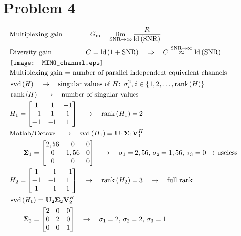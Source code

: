 \section*{Problem 4}
\begin{align*}
	&\text{Multiplexing gain}\qquad\qquad G_{\mathrm{m}}=\lim_{\mathrm{SNR}\rightarrow\infty}\frac{R}{\operatorname{ld}\left(\mathrm{SNR}\right)}& \\
	&\text{Diversity gain}\quad\qquad\qquad C=\operatorname{ld}\left(1+\mathrm{SNR}\right)\quad\Rightarrow\quad C\overset{\mathrm{SNR}\rightarrow\infty}{\approx}\operatorname{ld}\left(\mathrm{SNR}\right)& \\
	&\texttt{[image: MIMO\_channel.eps]}& \\
	&\text{Multiplexing gain $=$ number of parallel independent equivalent channels}& \\
	&\operatorname{svd}\left(H\right)\quad\rightarrow\quad\text{singular values of $H$: $\sigma_{i}^{2}$, $i\in\{1,2,\ldots,\operatorname{rank}\left(H\right)\}$}& \\
	&\operatorname{rank}\left(H\right)\quad\rightarrow\quad\text{number of singular values}& \\
	&H_{1}=
	\begin{bmatrix}
	1 & 1 & -1 \\
	-1 & 1 & 1 \\
	-1 & -1 & 1
	\end{bmatrix}\quad\rightarrow\quad\operatorname{rank}\left(H_{1}\right)=2& \\
	&\text{Matlab/Octave}\quad\rightarrow\quad\operatorname{svd}\left(H_{1}\right)=\mathbf{U}_{1}\mathbf{\Sigma}_{1}\mathbf{V}_{1}^{H}& \\
	&\qquad\mathbf{\Sigma}_{1}=
	\begin{bmatrix}
	2,56 & 0 & 0 \\
	0 & 1,56 & 0 \\
	0 & 0 & 0 
	\end{bmatrix}\quad\rightarrow\quad\text{$\sigma_{1}=2,56$, $\sigma_{2}=1,56$, $\sigma_{3}=0$ $\rightarrow$ useless}& \\
	&H_{2}=
	\begin{bmatrix}
	1 & -1 & -1 \\
	-1 & -1 & 1 \\
	1 & -1 & 1
	\end{bmatrix}\quad\rightarrow\quad\operatorname{rank}\left(H_{2}\right)=3\quad\rightarrow\quad\text{full rank}& \\
	&\operatorname{svd}\left(H_{1}\right)=\mathbf{U}_{2}\mathbf{\Sigma}_{2}\mathbf{V}_{2}^{H}& \\
	&\qquad\mathbf{\Sigma}_{2}=
	\begin{bmatrix}
	2 & 0 & 0 \\
	0 & 2 & 0 \\
	0 & 0 & 1 
	\end{bmatrix}\quad\rightarrow\quad\text{$\sigma_{1}=2$, $\sigma_{2}=2$, $\sigma_{3}=1$}& \\
\end{align*}